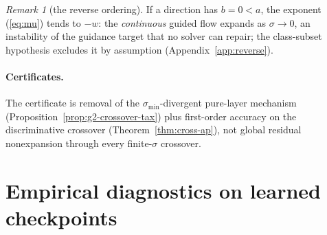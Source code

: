 \documentclass{article} %
\def\eqref#1{equation~\ref{#1}}
\theoremstyle{plain}
\theoremstyle{definition}
\theoremstyle{remark}
\newtheorem{remark}{Remark}
\providecommand{\smin}{\sigma_{\min}}
\def\eqref#1{(\ref{#1})}
\newif\ifarxiv
\begin{document}
\newcommand{\ReverseFull}{%
If a reversed singular direction has $b = 0 < a$---the marginal collapsed
where the class has not---then the exponent \eqref{eq:mu} tends to $-w$,
negative for every $w > 0$: the guided flow itself expands the coordinate
as $\sigma \to 0$, so no discretization can be uniformly stable because the
continuous target is not.  More generally, reverse ordering with
$0 < b < a$ can create finite-$\sigma$ expansion windows, but only the
reversed singular case creates this terminal instability.  This is a
property of the guidance target, not of the solver; the class-subset
hypothesis excludes it by assumption, and autoguidance-style constructions
aim to enforce the same directionality.
}
\ifarxiv
\begin{remark}[the reverse ordering]\label{rem:reverse}
\ReverseFull
\end{remark}
\else
\begin{remark}[the reverse ordering]\label{rem:reverse}
If a direction has $b = 0 < a$, the exponent \eqref{eq:mu} tends to $-w$:
the \emph{continuous} guided flow expands as $\sigma \to 0$, an instability
of the guidance target that no solver can repair; the class-subset
hypothesis excludes it by assumption
(Appendix~\ref{app:reverse}).
\end{remark}
\fi

\paragraph{Certificates.}
The certificate is removal of the $\smin$-divergent pure-layer mechanism
(Proposition~\ref{prop:g2-crossover-tax}) plus first-order accuracy on the
discriminative crossover (Theorem~\ref{thm:cross-ap}), not global residual
nonexpansion through every finite-$\sigma$ crossover.

%

\section{Empirical diagnostics on learned checkpoints}
\label{sec:checkpoint-certs}
\end{document}
